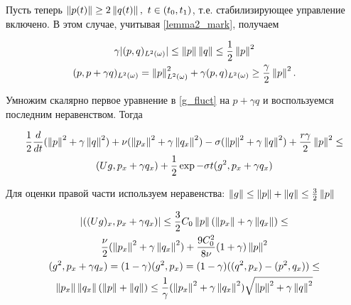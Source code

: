 Пусть теперь $\left\lVert p(t)\right\rVert \ge 2 \left\lVert q(t)\right\rVert, \ t \in (t_0, t_1)$, т.е.
стабилизирующее управление включено. В этом случае, учитывая
\eqref{lemma2_mark}, получаем

\begin{gather*}
    \gamma |(p, q)_{L^2(\omega)}| \le \left\lVert p\right\rVert \left\lVert q\right\rVert \le \frac{1}{2}
    \left\lVert p\right\rVert^2\\
    (p, p + \gamma q)_{L^2(\omega)} = \left\lVert p\right\rVert^2_{L^2(\omega)} + \gamma(p,
    q)_{L^2(\omega)} \ge \frac{\gamma}{2}\left\lVert p\right\rVert^2.
\end{gather*}

Умножим скалярно первое уравнение в \eqref{g_fluct} на $p + \gamma q$ и
воспользуемся последним неравенством. Тогда

\begin{gather*}
    \frac{1}{2} \frac{d}{dt} (\left\lVert p\right\rVert^2 + \gamma \left\lVert q\right\rVert^2) + \nu
    (\left\lVert p_x\right\rVert^2 + \gamma \left\lVert q_x\right\rVert^2) - \sigma (\left\lVert p\right\rVert^2 + \gamma
    \left\lVert q\right\rVert^2) + \frac{r\gamma}{2} \left\lVert p\right\rVert^2 \le \\
    (Ug, p_x + \gamma q_x) +
    \frac{1}{2} \exp{-\sigma t}(g^2, p_x + \gamma q_x)
\end{gather*}

Для оценки правой части используем неравенства: $\left\lVert g\right\rVert \le \left\lVert p\right\rVert + 
\left\lVert q\right\rVert \le \frac{3}{2} \left\lVert p\right\rVert$

\begin{gather*}
    |((U g)_x, p_x + \gamma q_x)| \le \frac{3}{2} C_0 \left\lVert p\right\rVert(\left\lVert p_x\right\rVert +
    \gamma \left\lVert q_x\right\rVert) \le \\
    \frac{\nu}{2} (\left\lVert p_x\right\rVert^2 + \gamma \left\lVert q_x\right\rVert^2) +
    \frac{9C_0^2}{8\nu}(1 + \gamma)\left\lVert p\right\rVert^2\\
    (g^2, p_x + \gamma q_x) = (1 - \gamma)(g^2, p_x) = (1 - \gamma)((q^2, p_x) -
    (p^2, q_x)) \le \\
    \left\lVert p_x\right\rVert\left\lVert q_x\right\rVert(\left\lVert p\right\rVert + \left\lVert q\right\rVert) \le \frac{1}{\gamma}(\left\lVert p_x\right\rVert^2
    + \gamma \left\lVert q_x\right\rVert^2)\sqrt{\left\lVert p\right\rVert^2 + \gamma \left\lVert q\right\rVert^2}
\end{gather*}

